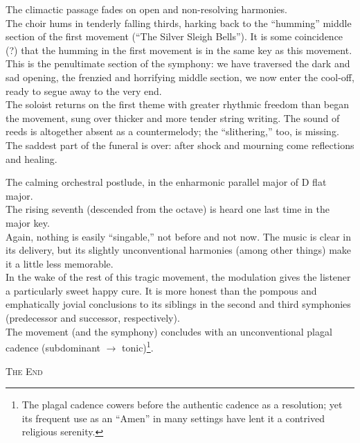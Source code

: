 \documentclass{beamer}
\begin{document}
\begin{frame}
  The climactic passage fades on open and non-resolving harmonies. 
  \pause \\
  The choir hums in tenderly falling thirds, harking back to the ``humming'' middle section of the first movement (``The Silver Sleigh Bells''). It is some coincidence (?) that the humming in the first movement is in the same key as this movement. 
  \pause \\
  This is the penultimate section of the symphony: we have traversed the dark and sad opening, the frenzied and horrifying middle section, we now enter the cool-off, ready to segue away to the very end. 
  \pause \\
  The soloist returns on the first theme with greater rhythmic freedom than began the movement, sung over thicker and more tender string writing. The sound of reeds is altogether absent as a countermelody; the ``slithering,'' too, is missing. 
  \pause \\ 
  The saddest part of the funeral is over: after shock and mourning come reflections and healing. 
\end{frame} 

\begin{frame}
  The calming orchestral postlude, in the enharmonic parallel major of D flat major. 
  \pause \\
  The rising seventh (descended from the octave) is heard one last time in the major key. 
  \pause \\
  Again, nothing is easily ``singable,'' not before and not now. The music is clear in its delivery, but its slightly unconventional harmonies (among other things) make it a little less memorable. 
  \pause \\ 
  In the wake of the rest of this tragic movement, the modulation gives the listener a particularly sweet happy cure. It is more honest than the pompous and emphatically jovial conclusions to its siblings in the second and third symphonies (predecessor and successor, respectively). 
  \pause \\
  The movement (and the symphony) concludes with an unconventional plagal cadence (subdominant \(\to\) tonic)\footnote{The plagal cadence cowers before the authentic cadence as a resolution; yet its frequent use as an ``Amen'' in many settings have lent it a contrived religious serenity.}. 
\end{frame} 

\begin{frame}
  \begin{center} 
    {\Large\textsc{The End} } 
  \end{center} 
\end{frame} 
\end{document}
